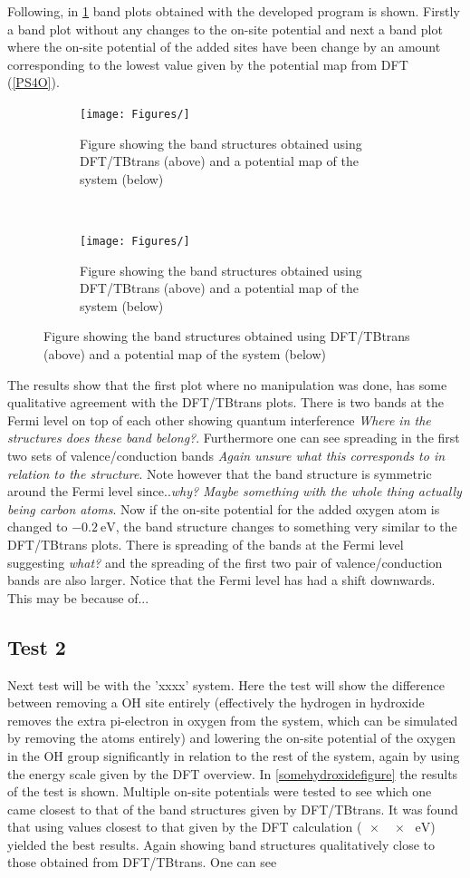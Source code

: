 Following, in \cref{PS4Odev} band plots obtained with the developed program is shown. Firstly a band plot without any changes to the on-site potential and next a band plot where the on-site potential of the added sites have been change by an amount corresponding to the lowest value given by the potential map from DFT (\cref{PS4O}).
\begin{figure}[h]
    \centering
    \begin{subfigure}[b]{0.45\textwidth}
    \centering
    \texttt{[image: Figures/]}
    \caption{Figure showing the band structures obtained using DFT/TBtrans (above) and a potential map of the system (below)}
    \end{subfigure}
    ~
    \begin{subfigure}[b]{0.45\textwidth}
    \centering
    \texttt{[image: Figures/]}
    \caption{Figure showing the band structures obtained using DFT/TBtrans (above) and a potential map of the system (below)}
    \end{subfigure}
    \label{PS4Odev}
\end{figure}
The results show that the first plot where no manipulation was done, has some qualitative agreement with the DFT/TBtrans plots. There is two bands at the Fermi level on top of each other showing quantum interference \textit{Where in the structures does these band belong?}. Furthermore  one can see spreading in the first two sets of valence/conduction bands \textit{Again unsure what this corresponds to in relation to the structure}. Note however that the band structure is symmetric around the Fermi level since..\textit{why? Maybe something with the whole thing actually being carbon atoms}. Now if the on-site potential for the added oxygen atom is changed to \(\SI{-0.2}{\electronvolt}\), the band structure changes to something very similar to the DFT/TBtrans plots. There is spreading of the bands at the Fermi level suggesting \textit{what?} and the spreading of the first two pair of valence/conduction bands are also larger. Notice that the Fermi level has had a shift downwards. This may be because of... 
\subsection{Test 2}
Next test will be with the 'xxxx' system. Here the test will show the difference between removing a OH site entirely (effectively the hydrogen in hydroxide removes the extra pi-electron in oxygen from the system, which can be simulated by removing the atoms entirely) and lowering the on-site potential of the oxygen in the OH group significantly in relation to the rest of the system, again by using the energy scale given by the DFT overview. In \cref{somehydroxidefigure} the results of the test is shown. Multiple on-site potentials were tested to see which one came closest to that of the band structures given by DFT/TBtrans. It was found that using values closest to that given by the DFT calculation (\(\SI{xx}{\electronvolt}\)) yielded the best results. Again showing band structures qualitatively close to those obtained from DFT/TBtrans. One can see 
